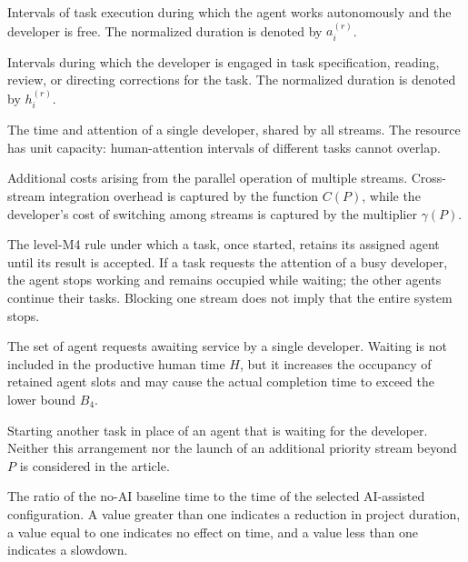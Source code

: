 \begin{description}[style=nextline]
  \item[Agent Component] Intervals of task execution during which the agent
  works autonomously and the developer is free. The normalized duration is
  denoted by $a_i^{(r)}$.

  \item[Human Component] Intervals during which the developer is engaged in
  task specification, reading, review, or directing corrections for the task.
  The normalized duration is denoted by $h_i^{(r)}$.

  \item[Human Resource] The time and attention of a single developer, shared by
  all streams. The resource has unit capacity: human-attention intervals of
  different tasks cannot overlap.

  \item[Coordination Overhead] Additional costs arising from the parallel
  operation of multiple streams. Cross-stream integration overhead is captured
  by the function $C(P)$, while the developer's cost of switching among streams
  is captured by the multiplier $\gamma(P)$.

  \item[Local Blocking of an Agent Slot] The level-M4 rule under which a task,
  once started, retains its assigned agent until its result is accepted. If a
  task requests the attention of a busy developer, the agent stops working and
  remains occupied while waiting; the other agents continue their tasks.
  Blocking one stream does not imply that the entire system stops.

  \item[Queue for Developer Attention] The set of agent requests awaiting
  service by a single developer. Waiting is not included in the productive
  human time $H$, but it increases the occupancy of retained agent slots and may
  cause the actual completion time to exceed the lower bound $B_4$.

  \item[Reuse of a Blocked Stream] Starting another task in place of an agent
  that is waiting for the developer. Neither this arrangement nor the launch of
  an additional priority stream beyond $P$ is considered in the article.

  \item[Speedup] The ratio of the no-AI baseline time to the time of the selected
  AI-assisted configuration. A value greater than one indicates a reduction in
  project duration, a value equal to one indicates no effect on time, and a
  value less than one indicates a slowdown.


\end{description}
